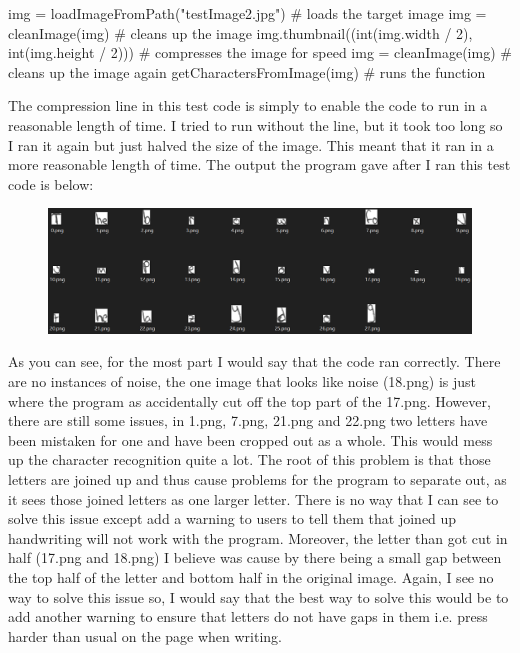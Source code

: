 \documentclass{report}
\begin{document}
\begin{python}
img = loadImageFromPath("testImage2.jpg")  # loads the target image
img = cleanImage(img)  # cleans up the image
img.thumbnail((int(img.width / 2), int(img.height / 2)))  # compresses the image for speed
img = cleanImage(img)  # cleans up the image again
getCharactersFromImage(img)  # runs the function
\end{python}
The compression line in this test code is simply to enable the code to run in a reasonable length of time. I tried to run without the line, but it took too long so I ran it again but just halved the size of the image. This meant that it ran in a more reasonable length of time.
\newline
The output the program gave after I ran this test code is below:
\begin{figure}[H]
    \centering
    \includegraphics[width=5in]{Images/Development and Testing/Stage 6/Tests/Test 1 Output.png}
    \label{fig:Test 1 Output}
\end{figure}
\noindent As you can see, for the most part I would say that the code ran correctly. There are no instances of noise, the one image that looks like noise (18.png) is just where the program as accidentally cut off the top part of the 17.png. However, there are still some issues, in 1.png, 7.png, 21.png and 22.png two letters have been mistaken for one and have been cropped out as a whole. This would mess up the character recognition quite a lot. The root of this problem is that those letters are joined up and thus cause problems for the program to separate out, as it sees those joined letters as one larger letter. There is no way that I can see to solve this issue except add a warning to users to tell them that joined up handwriting will not work with the program. Moreover, the letter than got cut in half (17.png and 18.png) I believe was cause by there being a small gap between the top half of the letter and bottom half in the original image. Again, I see no way to solve this issue so, I would say that the best way to solve this would be to add another warning to ensure that letters do not have gaps in them i.e. press harder than usual on the page when writing.
\end{document}
